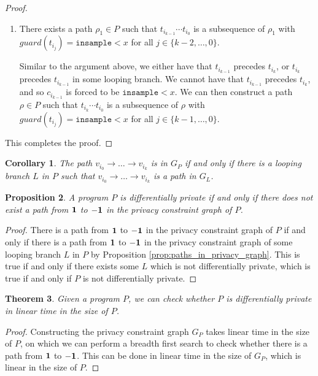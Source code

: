 \documentclass[12pt]{article}
\newcommand{\lguard}[1][x]{\texttt{insample} < #1}
\newtheorem{thm}{Theorem}[section]
\newtheorem{prop}[thm]{Proposition}
\newtheorem{cor}[thm]{Corollary}
\theoremstyle{definition}
\begin{document}
\begin{proof}
\begin{itemize}
\begin{enumerate}
            \item There exists a path $\rho_1 \in P$ such that $t_{i_{k - 1}} \cdots t_{i_0}$ is a subsequence of $\rho_1$ with $guard(t_{i_j}) = \lguard$ for all $j \in \{k - 2, \dots, 0\}$.
            
            Similar to the argument above, we either have that $t_{i_{k - 1}}$ precedes $t_{i_k}$, or $t_{i_k}$ precedes $t_{i_{k - 1}}$ in some looping branch. We cannot have that $t_{i_{k - 1}}$ precedes $t_{i_k}$, and so $c_{i_{k - 1}}$ is forced to be $\lguard$. We can then construct a path $\rho \in P$ such that $t_{i_k} \cdots t_{i_0}$ is a subsequence of $\rho$ with $guard(t_{i_j}) = \lguard$ for all $j \in \{k - 1, \dots, 0\}$. 
        \end{enumerate}
    \end{itemize}

    This completes the proof. 
\end{proof}


\begin{cor}
    The path $v_{i_0} \to \dots \to v_{i_k}$ is in $G_P$ if and only if there is a looping branch $L$ in $P$ such that $v_{i_0} \to \dots \to v_{i_k}$ is a path in $G_L$.
\end{cor}

\begin{prop}
    A program $P$ is differentially private if and only if there does not exist a path from $\bf 1$ to $\bf -1$ in the privacy constraint graph of $P$.
\end{prop}

\begin{proof}
    There is a path from $\bf 1$ to $\bf -1$ in the privacy constraint graph of $P$ if and only if there is a path from $\bf 1$ to $\bf -1$ in the privacy constraint graph of some looping branch $L$ in $P$ by Proposition \ref{prop:paths_in_privacy_graph}. This is true if and only if there exists some $L$ which is not differentially private, which is true if and only if $P$ is not differentially private.
\end{proof}

\begin{thm}
    Given a program $P$, we can check whether $P$ is differentially private in linear time in the size of $P$.
\end{thm}

\begin{proof}
    Constructing the privacy constraint graph $G_P$ takes linear time in the size of $P$, on which we can perform a breadth first search to check whether there is a path from $\bf 1$ to $\bf -1$. This can be done in linear time in the size of $G_P$, which is linear in the size of $P$.
\end{proof}
\end{document}

